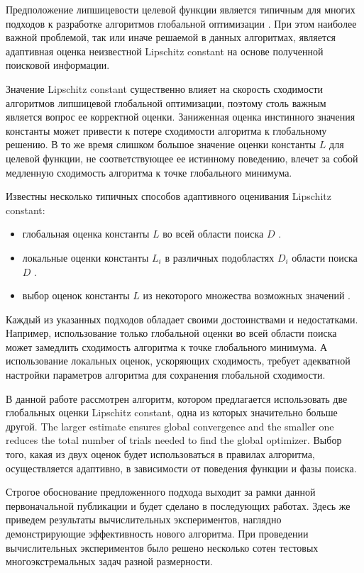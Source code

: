 \documentclass[runningheads]{llncs}
\begin{document}
Предположение липшицевости целевой функции является типичным для многих подходов к разработке алгоритмов глобальной оптимизации \cite{Evtushenko2013,Zilinskas2010,Pinter1996,Strongin2000}. При этом наиболее важной проблемой, так или иначе решаемой в данных алгоритмах, является адаптивная оценка неизвестной Lipschitz constant на основе полученной поисковой информации. 

Значение Lipschitz constant существенно влияет на скорость сходимости алгоритмов липшицевой глобальной оптимизации, поэтому столь важным является вопрос ее корректной оценки. Заниженная оценка инстинного значения константы может привести к потере сходимости алгоритма к глобальному решению. В то же время слишком большое значение оценки константы $L$ для целевой функции, не соответствующее ее истинному поведению, влечет за собой медленную сходимость алгоритма к точке глобального минимума. 

Известны несколько типичных способов адаптивного оценивания Lipschitz constant:
\begin{itemize}
	\item глобальная оценка константы $L$ во всей области поиска $D$ \cite{Horst1996,Pinter1996,Strongin2000}.
	\item локальные оценки константы $L_i$ в различных подобластях $D_i$ области поиска $D$ \cite{Kvasov2003,Sergeyev2010,Sergeyev2016}.
	\item выбор оценок константы $L$ из некоторого множества возможных значений \cite{Gablonsky2001,Jones1993,Jones2009,Sergeyev2006}.
\end{itemize}

Каждый из указанных подходов обладает своими достоинствами и недостатками. Например, использование только глобальной оценки во всей области поиска может замедлить сходимость алгоритма к точке глобального минимума. А использование локальных оценок, ускоряющих сходимость, требует адекватной настройки параметров алгоритма для сохранения глобальной сходимости. 

В данной работе рассмотрен алгоритм, котором предлагается использовать две глобальных оценки Lipschitz constant, одна из которых значительно больше другой. 
The larger estimate ensures global convergence and the smaller one reduces the total number of trials needed to find the global optimizer.
Выбор того, какая из двух оценок будет использоваться в правилах алгоритма, осуществляется адаптивно, в зависимости от поведения функции и фазы поиска.

Строгое обоснование предложенного подхода выходит за рамки данной первоначальной публикации и будет сделано в последующих работах. Здесь же приведем результаты вычислительных экспериментов, наглядно демонстрирующие эффективность нового алгоритма. При проведении вычислительных экспериментов было решено несколько сотен тестовых многоэкстремальных задач разной размерности.
\end{document}

